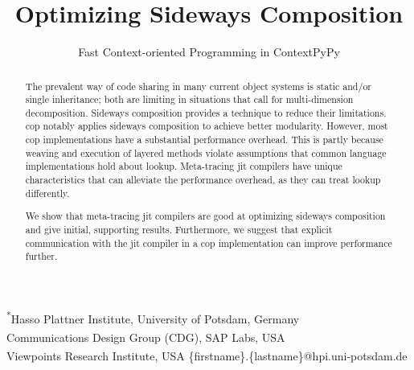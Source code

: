 \documentclass[preprint,english,10pt,nonatbib]{sigplanconf}
\begin{document}



\title{Optimizing Sideways Composition}
\subtitle{Fast Context-oriented Programming in ContextPyPy}

           {\textsuperscript{*}Hasso Plattner Institute, University of Potsdam, Germany\\
           \textsuperscript{\textdagger}Communications Design Group (CDG), SAP Labs, USA\\
           \textsuperscript{\textdagger}Viewpoints Research Institute, USA}
           {\{firstname\}.\{lastname\}@hpi.uni-potsdam.de}

\maketitle

\begin{abstract}
  The prevalent way of code sharing in many current object systems is static
  and/or single inheritance; both are limiting in situations that call for
  multi-dimension decomposition. Sideways composition provides a technique to
  reduce their limitations. \Ac{cop} notably applies sideways composition to
  achieve better modularity. However, most \ac{cop} implementations have a
  substantial performance overhead. This is partly because weaving and
  execution of layered methods violate assumptions that common language
  implementations hold about lookup. Meta-tracing \ac{jit} compilers have
  unique characteristics that can alleviate the performance overhead, as they
  can treat lookup differently.

  We show that meta-tracing \ac{jit} compilers are good at optimizing
  sideways composition and give initial, supporting results. Furthermore, we
  suggest that explicit communication with the \ac{jit} compiler in a \ac{cop}
  implementation can improve performance further.
  \end{abstract}
\end{document}
